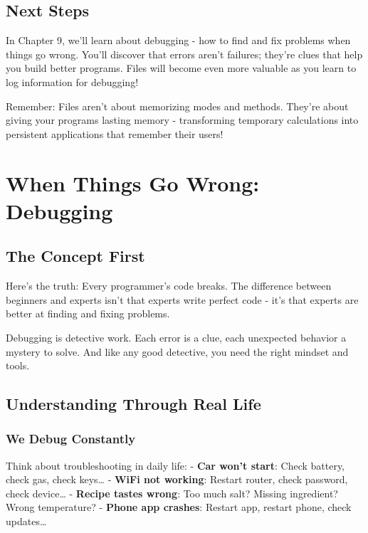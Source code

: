 \documentclass[
  letterpaper,
  DIV=11,
  numbers=noendperiod,
  oneside]{scrreprt}
\begin{document}
\section{Next Steps}\label{next-steps-8}

In Chapter 9, we'll learn about debugging - how to find and fix problems
when things go wrong. You'll discover that errors aren't failures;
they're clues that help you build better programs. Files will become
even more valuable as you learn to log information for debugging!

Remember: Files aren't about memorizing modes and methods. They're about
giving your programs lasting memory - transforming temporary
calculations into persistent applications that remember their users!

\chapter{When Things Go Wrong: Debugging}\label{sec-debugging}

\section{The Concept First}\label{the-concept-first-8}

Here's the truth: Every programmer's code breaks. The difference between
beginners and experts isn't that experts write perfect code - it's that
experts are better at finding and fixing problems.

Debugging is detective work. Each error is a clue, each unexpected
behavior a mystery to solve. And like any good detective, you need the
right mindset and tools.

\section{Understanding Through Real
Life}\label{understanding-through-real-life-8}

\subsection{We Debug Constantly}\label{we-debug-constantly}

Think about troubleshooting in daily life: - \textbf{Car won't start}:
Check battery, check gas, check keys\ldots{} - \textbf{WiFi not
working}: Restart router, check password, check device\ldots{} -
\textbf{Recipe tastes wrong}: Too much salt? Missing ingredient? Wrong
temperature? - \textbf{Phone app crashes}: Restart app, restart phone,
check updates\ldots{}
\end{document}
